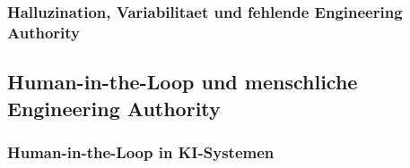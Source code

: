 \subsubsection{Halluzination, Variabilitaet und fehlende Engineering Authority}
\label{sec:llm_limitations}

%
%
%
%
%
%
%
%
%


\subsection{Human-in-the-Loop und menschliche Engineering Authority}
\label{sec:hitl_foundation}

\subsubsection{Human-in-the-Loop in KI-Systemen}
\label{sec:hitl_definition}

%
%
%
%
%
%


